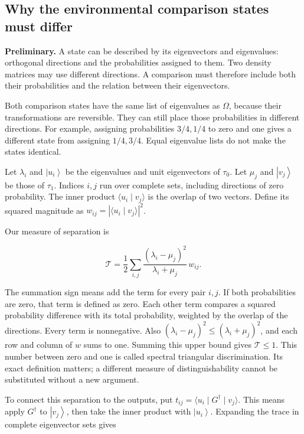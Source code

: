 \documentclass[11pt,letterpaper]{article}
\begin{document}
\subsection{Why the environmental comparison states must differ}\label{subsec:spectral-separation}

\textbf{Preliminary.} A state can be described by its eigenvectors and eigenvalues: orthogonal directions and the probabilities assigned to them. Two density matrices may use different directions. A comparison must therefore include both their probabilities and the relation between their eigenvectors.

Both comparison states have the same list of eigenvalues as \(\Omega\), because their transformations are reversible. They can still place those probabilities in different directions. For example, assigning probabilities \(3/4,1/4\) to zero and one gives a different state from assigning \(1/4,3/4\). Equal eigenvalue lists do not make the states identical.

Let \(\lambda_{i}\) and \(\left| u_{i} \right\rangle\) be the eigenvalues and unit eigenvectors of \(\tau_{0}\). Let \(\mu_{j}\) and \(\left| v_{j} \right\rangle\) be those of \(\tau_{1}\). Indices \(i,j\) run over complete sets, including directions of zero probability. The inner product \(\langle u_{i} \mid v_{j}\rangle\) is the overlap of two vectors. Define its squared magnitude as \(w_{ij} = \left| \langle u_{i} \mid v_{j}\rangle \right|^{2}\).

Our measure of separation is

\[\mathcal{T} = \frac{1}{2}\sum_{i,j}^{}\frac{\left( \lambda_{i} - \mu_{j} \right)^{2}}{\lambda_{i} + \mu_{j}}\, w_{ij}.\]

The summation sign means add the term for every pair \(i,j\). If both probabilities are zero, that term is defined as zero. Each other term compares a squared probability difference with its total probability, weighted by the overlap of the directions. Every term is nonnegative. Also \(\left( \lambda_{i} - \mu_{j} \right)^{2} \leq \left( \lambda_{i} + \mu_{j} \right)^{2}\), and each row and column of \(w\) sums to one. Summing this upper bound gives \(\mathcal{T} \leq 1\). This number between zero and one is called spectral triangular discrimination. Its exact definition matters; a different measure of distinguishability cannot be substituted without a new argument.

To connect this separation to the outputs, put \(t_{ij} = \langle u_{i} \mid G^{\dagger} \mid v_{j}\rangle\). This means apply \(G^{\dagger}\) to \(\left| v_{j} \right\rangle\), then take the inner product with \(\left| u_{i} \right\rangle\). Expanding the trace in complete eigenvector sets gives
\end{document}
